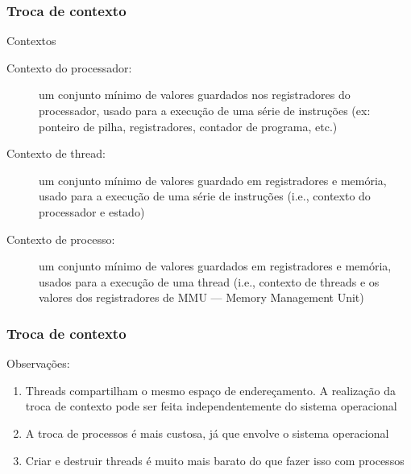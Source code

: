 \documentclass[Ligatures=TeX,table,brazil,svgnames,usetotalslideindicator,compress,10pt]{beamer}
\begin{document}
\begin{frame}
  \frametitle{Troca de contexto}
  \begin{block}{Contextos}
    \begin{description}
    \item[Contexto do processador:] um conjunto mínimo de valores
      guardados nos registradores do processador, usado para a
      execução de uma série de instruções (ex: ponteiro de pilha,
      registradores, contador de programa, etc.)
    \item[Contexto de thread:] um conjunto mínimo de valores guardado
      em registradores e memória, usado para a execução de uma série
      de instruções (i.e., contexto do processador e estado)
    \item[Contexto de processo:] um conjunto mínimo de valores
      guardados em registradores e memória, usados para a execução de
      uma thread (i.e., contexto de threads e os valores dos
      registradores de MMU --- Memory Management Unit)
    \end{description}
  \end{block}
\end{frame}

\begin{frame}
  \frametitle{Troca de contexto}

  Observações:

  \begin{enumerate}
  \item Threads compartilham o mesmo espaço de endereçamento. A
    realização da troca de contexto pode ser feita independentemente
    do sistema operacional
  \item A troca de processos é mais custosa, já que envolve o sistema
    operacional
  \item Criar e destruir threads é muito mais barato do que fazer isso
    com processos
  \end{enumerate}

\end{frame}
\end{document}
